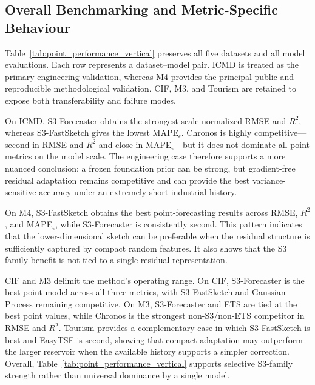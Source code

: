 \subsection{Overall Benchmarking and Metric-Specific Behaviour}
\label{subsec:benchmark_results}

Table~\ref{tab:point_performance_vertical} preserves all five datasets and all
model evaluations. Each row represents a dataset--model pair. ICMD
is treated as the primary engineering validation, whereas M4 provides the
principal public and reproducible methodological validation. CIF, M3, and
Tourism are retained to expose both transferability and failure modes.

On ICMD, S3-Forecaster obtains the strongest scale-normalized RMSE and $R^2$,
whereas S3-FastSketch gives the lowest MAPE$_\epsilon$. Chronos is highly
competitive---second in RMSE and $R^2$ and close in MAPE$_\epsilon$---but it
does not dominate all point metrics on the model scale. The
engineering case therefore supports a more nuanced conclusion: a frozen
foundation prior can be strong, but gradient-free residual adaptation remains
competitive and can provide the best variance-sensitive accuracy under an
extremely short industrial history.

On M4, S3-FastSketch obtains the best point-forecasting results across RMSE,
$R^2$, and MAPE$_\epsilon$, while S3-Forecaster is consistently second. This
pattern indicates that the lower-dimensional sketch can be preferable when the
residual structure is sufficiently captured by compact random features. It also
shows that the S3 family benefit is not tied to a single residual representation.

CIF and M3 delimit the method's operating range. On CIF, S3-Forecaster is the
best point model across all three metrics, with S3-FastSketch and Gaussian
Process remaining competitive. On M3, S3-Forecaster and ETS are tied at the best
point values, while Chronos is the strongest non-S3/non-ETS competitor in RMSE
and $R^2$. Tourism provides a complementary case in which S3-FastSketch is best
and EasyTSF is second, showing that compact adaptation may outperform the larger
reservoir when the available history supports a simpler correction. Overall,
Table~\ref{tab:point_performance_vertical} supports selective S3-family
strength rather than universal dominance by a single model.



